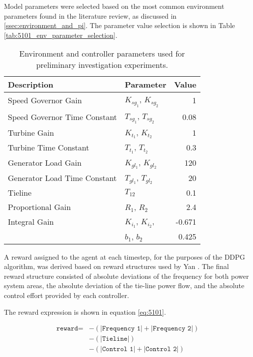 Model parameters were selected based on the most common environment parameters found in the literature review, as discussed in \textsection \ref{ssec:environment_and_pi}. The parameter value selection is shown in Table \ref{tab:5101_env_parameter_selection}.

\begin{table}[h]
	\centering
	\caption[Environment and PI controller parameters]{Environment and controller parameters used for preliminary investigation experiments.}\label{tab:5101_env_parameter_selection}
	\begin{tabular}{llr}
		\toprule
		\textbf{Description} & \textbf{Parameter} & \textbf{Value} \\
		\midrule
		Speed Governor Gain & $K_{sg_1}$, $K_{sg_2}$ & 1 \\
		Speed Governor Time Constant & $T_{sg_1}$, $T_{sg_2}$ & 0.08 \\
		Turbine Gain & $K_{t_1}$, $K_{t_2}$ & 1 \\
		Turbine Time Constant & $T_{t_1}$, $T_{t_2}$ & 0.3 \\
		Generator Load Gain & $K_{gl_1}$, $K_{gl_2}$ & 120 \\
		Generator Load Time Constant & $T_{gl_1}$, $T_{gl_2}$ & 20 \\
		Tieline & $T_{12}$ & 0.1 \\
		Proportional Gain & $R_1$, $R_2$ & 2.4 \\
		Integral Gain & $K_{i_1}$, $K_{i_2}$, & -0.671 \\
		 & $b_1$, $b_2$ & 0.425 \\
		\bottomrule
	\end{tabular}\label{tab:5000}
\end{table}

A reward assigned to the agent at each timestep, for the purposes of the DDPG algorithm, was derived based on reward structures used by Yan \cite{Yan2020}. The final reward structure consisted of absolute deviations of the frequency for both power system areas, the absolute deviation of the tie-line power flow, and the absolute control effort provided by each controller.

The reward expression is shown in equation \ref{eq:5101}.

\begin{equation}
	\begin{split}
		\texttt{reward} = 	&- (|\texttt{Frequency 1}| + |\texttt{Frequency 2}|) \\
			  				&- (|\texttt{Tieline}|) \\
			  				&- (|\texttt{Control 1}| + |\texttt{Control 2}|)\label{eq:5101}
	\end{split}
\end{equation}
